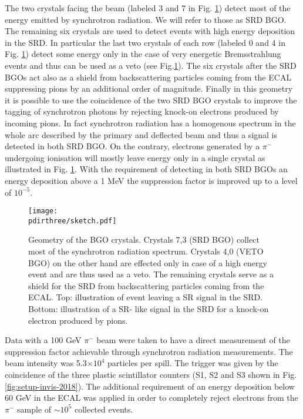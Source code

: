 The two crystals facing the beam (labeled 3 and 7 in Fig. \ref{fig:newgeo}) detect most of the energy emitted by synchrotron radiation. We will refer to those as SRD BGO. The remaining six crystals are used to detect events with high energy deposition in the SRD. In particular the last two crystals of each row (labeled 0 and 4 in Fig. \ref{fig:newgeo}) detect some energy only in the case of very energetic Bremsstrahlung events and thus can be used as a veto (see Fig.\ref{fig:newgeo}). The six crystals after the SRD BGOs act also as a shield from backscattering particles coming from the ECAL suppressing pions by an additional order of magnitude. Finally in this geometry it is possible to use the coincidence of the two SRD BGO crystals to improve the tagging of synchrotron photons by rejecting knock-on electrons produced by incoming pions. In fact synchrotron radiation has a homogenous spectrum in the whole arc described by the primary and deflected beam and thus a signal is detected in both SRD BGO. On the contrary, electrons generated by a $\pi^-$ undergoing ionisation will mostly leave energy only in a single crystal as illustrated in Fig. \ref{fig:newgeo}. 
With the requirement of detecting in both SRD BGOs an energy deposition above a 1 MeV the suppression factor is improved up to a level of $10^{-5}$.



\begin{figure}[htb!]
  \centering
  \texttt{[image: \\pdirthree/sketch.pdf]}
  \caption[Geometry of the BGO crystals]{Geometry of the BGO crystals. Crystals 7,3 (SRD BGO) collect most of the synchrotron radiation spectrum. Crystals 4,0 (VETO BGO) on the other hand are effected only in case of a high energy event and are thus used as a veto. The remaining crystals serve as a shield for the SRD from backscattering particles coming from the ECAL. Top: illustration of event leaving a SR signal in the SRD. Bottom: illustration of a SR- like signal in the SRD for a knock-on electron produced by pions.}
\label{fig:newgeo}
\end{figure}

Data with a 100 GeV $\pi^-$ beam were taken to have a direct measurement of the suppression factor achievable through synchrotron radiation measurements. The beam intensity was 5.3$\times 10^4$ particles per spill. The trigger was given by the coincidence of the three plastic scintillator counters (S1, S2 and S3 shown in Fig.\ref{fig:setup-invis-2018}). The additional requirement of an energy deposition below 60 GeV in the ECAL was applied in order to completely reject electrons from the $\pi^-$ sample of $\sim 10^5$ collected events.

